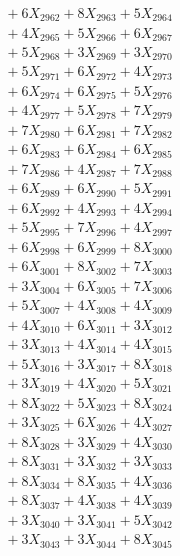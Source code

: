 \documentclass[a4paper,10pt]{article}
\begin{document}
{\begin{align}
&\;  + 6 X_{2962} + 8 X_{2963} + 5 X_{2964} \\[0.3ex]
&\;  + 4 X_{2965} + 5 X_{2966} + 6 X_{2967} \\[0.3ex]
&\;  + 5 X_{2968} + 3 X_{2969} + 3 X_{2970} \\[0.3ex]
&\;  + 5 X_{2971} + 6 X_{2972} + 4 X_{2973} \\[0.3ex]
&\;  + 6 X_{2974} + 6 X_{2975} + 5 X_{2976} \\[0.3ex]
&\;  + 4 X_{2977} + 5 X_{2978} + 7 X_{2979} \\[0.5ex]\allowbreak
&\;  + 7 X_{2980} + 6 X_{2981} + 7 X_{2982} \\[0.3ex]
&\;  + 6 X_{2983} + 6 X_{2984} + 6 X_{2985} \\[0.3ex]
&\;  + 7 X_{2986} + 4 X_{2987} + 7 X_{2988} \\[0.3ex]
&\;  + 6 X_{2989} + 6 X_{2990} + 5 X_{2991} \\[0.3ex]
&\;  + 6 X_{2992} + 4 X_{2993} + 4 X_{2994} \\[0.3ex]
&\;  + 5 X_{2995} + 7 X_{2996} + 4 X_{2997} \\[0.3ex]
&\;  + 6 X_{2998} + 6 X_{2999} + 8 X_{3000} \\[0.3ex]
&\;  + 6 X_{3001} + 8 X_{3002} + 7 X_{3003} \\[0.3ex]
&\;  + 3 X_{3004} + 6 X_{3005} + 7 X_{3006} \\[0.3ex]
&\;  + 5 X_{3007} + 4 X_{3008} + 4 X_{3009} \\[0.5ex]\allowbreak
&\;  + 4 X_{3010} + 6 X_{3011} + 3 X_{3012} \\[0.3ex]
&\;  + 3 X_{3013} + 4 X_{3014} + 4 X_{3015} \\[0.3ex]
&\;  + 5 X_{3016} + 3 X_{3017} + 8 X_{3018} \\[0.3ex]
&\;  + 3 X_{3019} + 4 X_{3020} + 5 X_{3021} \\[0.3ex]
&\;  + 8 X_{3022} + 5 X_{3023} + 8 X_{3024} \\[0.3ex]
&\;  + 3 X_{3025} + 6 X_{3026} + 4 X_{3027} \\[0.3ex]
&\;  + 8 X_{3028} + 3 X_{3029} + 4 X_{3030} \\[0.3ex]
&\;  + 8 X_{3031} + 3 X_{3032} + 3 X_{3033} \\[0.3ex]
&\;  + 8 X_{3034} + 8 X_{3035} + 4 X_{3036} \\[0.3ex]
&\;  + 8 X_{3037} + 4 X_{3038} + 4 X_{3039} \\[0.5ex]\allowbreak
&\;  + 3 X_{3040} + 3 X_{3041} + 5 X_{3042} \\[0.3ex]
&\;  + 3 X_{3043} + 3 X_{3044} + 8 X_{3045} \\[0.3ex]

\end{align}}
\end{document}
